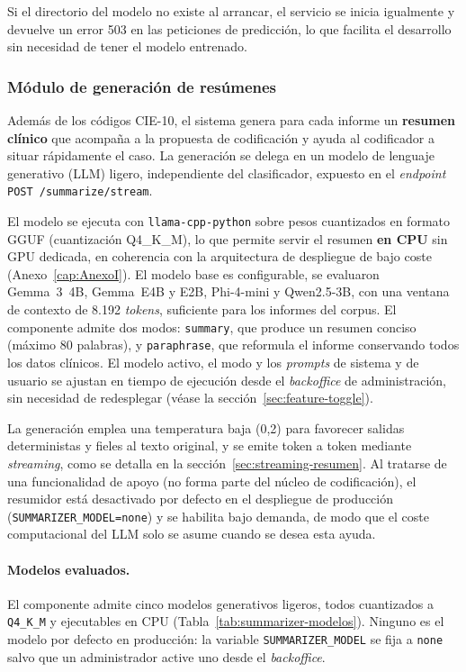 Si el directorio del modelo no existe al arrancar, el servicio se inicia igualmente y devuelve un error 503 en las peticiones de predicción, lo que facilita el desarrollo sin necesidad de tener el modelo entrenado.

\subsubsection{Módulo de generación de resúmenes}
\label{sec:resumidor}

Además de los códigos CIE-10, el sistema genera para cada informe un \textbf{resumen clínico} que acompaña a la propuesta de codificación y ayuda al codificador a situar rápidamente el caso. La generación se delega en un modelo de lenguaje generativo (LLM) ligero, independiente del clasificador, expuesto en el \emph{endpoint} \texttt{POST /summarize/stream}.

El modelo se ejecuta con \texttt{llama-cpp-python} sobre pesos cuantizados en formato GGUF (cuantización Q4\_K\_M), lo que permite servir el resumen \textbf{en CPU} sin GPU dedicada, en coherencia con la arquitectura de despliegue de bajo coste (Anexo~\ref{cap:AnexoI}). El modelo base es configurable, se evaluaron Gemma~3~4B, Gemma~E4B y E2B, Phi-4-mini y Qwen2.5-3B, con una ventana de contexto de 8.192 \emph{tokens}, suficiente para los informes del corpus. El componente admite dos modos: \texttt{summary}, que produce un resumen conciso (máximo 80 palabras), y \texttt{paraphrase}, que reformula el informe conservando todos los datos clínicos. El modelo activo, el modo y los \emph{prompts} de sistema y de usuario se ajustan en tiempo de ejecución desde el \emph{backoffice} de administración, sin necesidad de redesplegar (véase la sección~\ref{sec:feature-toggle}).

La generación emplea una temperatura baja (0,2) para favorecer salidas deterministas y fieles al texto original, y se emite token a token mediante \emph{streaming}, como se detalla en la sección~\ref{sec:streaming-resumen}. Al tratarse de una funcionalidad de apoyo (no forma parte del núcleo de codificación), el resumidor está desactivado por defecto en el despliegue de producción (\texttt{SUMMARIZER\_MODEL=none}) y se habilita bajo demanda, de modo que el coste computacional del LLM solo se asume cuando se desea esta ayuda.

\paragraph{Modelos evaluados.} El componente admite cinco modelos generativos ligeros, todos cuantizados a \texttt{Q4\_K\_M} y ejecutables en CPU (Tabla~\ref{tab:summarizer-modelos}). Ninguno es el modelo por defecto en producción: la variable \texttt{SUMMARIZER\_MODEL} se fija a \texttt{none} salvo que un administrador active uno desde el \emph{backoffice}.

